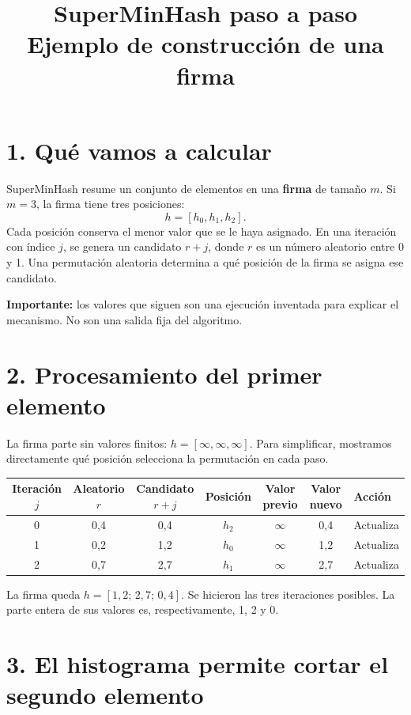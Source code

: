 \documentclass[11pt,a4paper]{article}
\title{SuperMinHash paso a paso\\\large Ejemplo de construcción de una firma}
\author{}
\date{}
\begin{document}
\maketitle
\vspace{-2.0em}

\section*{1. Qué vamos a calcular}

SuperMinHash resume un conjunto de elementos en una \textbf{firma} de tamaño
$m$. Si $m=3$, la firma tiene tres posiciones:
\[
  h = [h_0,h_1,h_2].
\]
Cada posición conserva el menor valor que se le haya asignado. En una iteración
con índice $j$, se genera un candidato $r+j$, donde $r$ es un número aleatorio
entre 0 y 1. Una permutación aleatoria determina a qué posición de la firma se
asigna ese candidato.

\textbf{Importante:} los valores que siguen son una ejecución inventada para
explicar el mecanismo. No son una salida fija del algoritmo.

\section*{2. Procesamiento del primer elemento}

La firma parte sin valores finitos: $h=[\infty,\infty,\infty]$. Para simplificar,
mostramos directamente qué posición selecciona la permutación en cada paso.

\begin{center}
\begin{tabular}{ccccccl}
\toprule
Iteración $j$ & Aleatorio $r$ & Candidato $r+j$ & Posición & Valor previo & Valor nuevo & Acción \\
\midrule
0 & 0,4 & 0,4 & $h_2$ & $\infty$ & 0,4 & Actualiza \\
1 & 0,2 & 1,2 & $h_0$ & $\infty$ & 1,2 & Actualiza \\
2 & 0,7 & 2,7 & $h_1$ & $\infty$ & 2,7 & Actualiza \\
\bottomrule
\end{tabular}
\end{center}

La firma queda $h=[1,2;\,2,7;\,0,4]$. Se hicieron las tres iteraciones
posibles. La parte entera de sus valores es, respectivamente, 1, 2 y 0.

\section*{3. El histograma permite cortar el segundo elemento}
\end{document}
